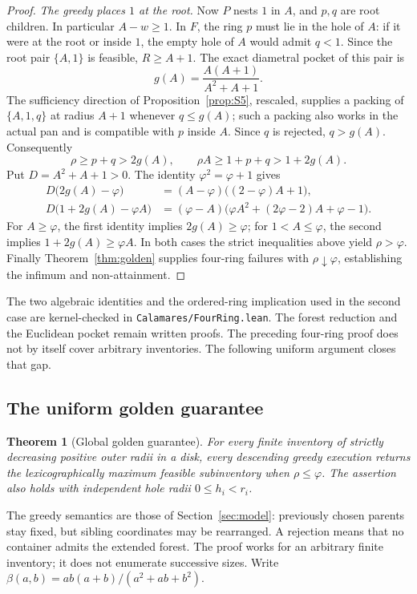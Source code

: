 \documentclass[11pt]{article}
\newtheorem{theorem}{Theorem}
\theoremstyle{definition}
\begin{document}
\begin{proof}
\emph{The greedy places $1$ at the root.} Now $P$ nests $1$ in
$A$, and $p,q$ are root children. In particular $A-w\ge1$.
In $F$, the ring $p$ must lie in the hole of $A$: if it were at the
root or inside $1$, the empty hole of $A$ would admit $q<1$.
Since the root pair $\{A,1\}$ is feasible, $R\ge A+1$. The exact
diametral pocket of this pair is
\[
 g(A)=\frac{A(A+1)}{A^2+A+1}.
\]
The sufficiency direction of Proposition~\ref{prop:S5}, rescaled,
supplies a packing of
$\{A,1,q\}$ at radius $A+1$ whenever $q\le g(A)$; such a packing
also works in the actual pan and is compatible with $p$ inside $A$.
Since $q$ is rejected, $q>g(A)$. Consequently
\[
 \rho\ge p+q>2g(A),\qquad
 \rho A\ge1+p+q>1+2g(A).
\]
Put $D=A^2+A+1>0$. The identity $\varphi^2=\varphi+1$ gives
\begin{align*}
 D\bigl(2g(A)-\varphi\bigr)
  &=(A-\varphi)\bigl((2-\varphi)A+1\bigr),\\
 D\bigl(1+2g(A)-\varphi A\bigr)
  &=(\varphi-A)\bigl(\varphi A^2+(2\varphi-2)A+\varphi-1\bigr).
\end{align*}
For $A\ge\varphi$, the first identity implies $2g(A)\ge\varphi$;
for $1<A\le\varphi$, the second implies $1+2g(A)\ge\varphi A$.
In both cases the strict inequalities above yield $\rho>\varphi$.
Finally Theorem~\ref{thm:golden} supplies four-ring failures with
$\rho\downarrow\varphi$, establishing the infimum and non-attainment.
\end{proof}

The two algebraic identities and the ordered-ring implication used in
the second case are kernel-checked in \texttt{Calamares/FourRing.lean}.
The forest reduction and the Euclidean pocket remain written proofs.
The preceding four-ring proof does not by itself cover arbitrary
inventories. The following uniform argument closes that gap.

\clearpage
\subsection{The uniform golden guarantee}\label{sec:goldenglobal}
\begin{theorem}[Global golden guarantee]\label{thm:golden-global}\label{conj:golden}
For every finite inventory of strictly decreasing positive outer radii
in a disk, every descending greedy execution returns the lexicographically
maximum feasible subinventory when $\rho\le\varphi$. The assertion
also holds with independent hole radii $0\le h_i<r_i$.
\end{theorem}
The greedy semantics are those of Section~\ref{sec:model}: previously
chosen parents stay fixed, but sibling coordinates may be rearranged.
A rejection means that no container admits the extended forest.
The proof works for an arbitrary finite inventory; it does not enumerate
successive sizes. Write $\beta(a,b)=ab(a+b)/(a^2+ab+b^2)$.
\end{document}
